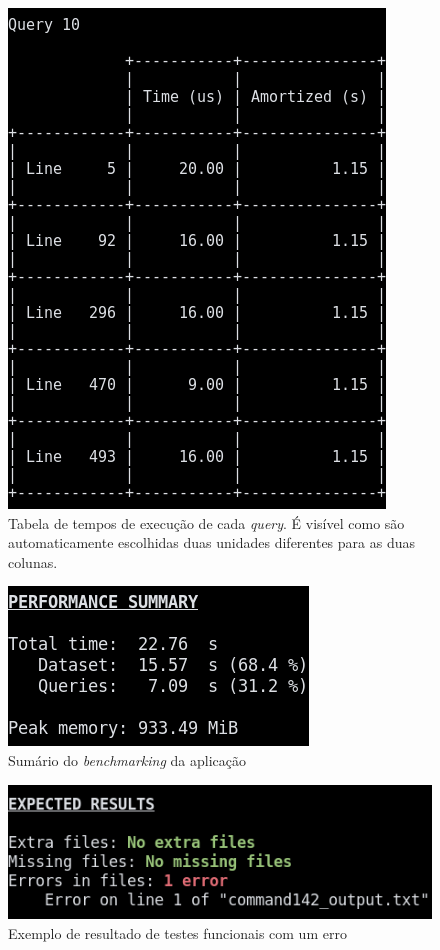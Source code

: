 \documentclass[11pt, a4paper]{article}
\begin{document}
\begin{figure}[H]
    \centering
    \includegraphics[scale=0.5]{res-fase2/testing_screenshots/query.png}
    \caption{Tabela de tempos de execução de cada \emph{query}. É visível como são automaticamente
             escolhidas duas unidades diferentes para as duas colunas.}
    \label{fig:q10-screenshot}
\end{figure}

\begin{figure}[H]
    \centering
    \includegraphics[scale=0.7]{res-fase2/testing_screenshots/summary.png}
    \caption{Sumário do \emph{benchmarking} da aplicação}
    \label{fig:performance-summary}
\end{figure}

\begin{figure}[H]
    \centering
    \includegraphics[scale=0.6]{res-fase2/testing_screenshots/diff.png}
    \caption{Exemplo de resultado de testes funcionais com um erro}
    \label{fig:diff-screenshot}
\end{figure}
\end{document}
